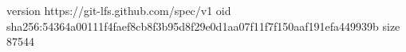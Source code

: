 version https://git-lfs.github.com/spec/v1
oid sha256:54364a00111f4faef8cb8f3b95d8f29e0d1aa07f11f7f150aaf191efa449939b
size 87544
